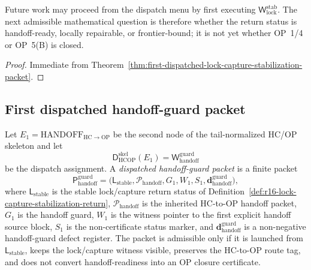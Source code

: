\begin{corollary}
\label{cor:v3340-r16-working-rule}
Future work may proceed from the dispatch menu by first executing \(\mathsf W_{\mathrm{lock}}^{\mathrm{stab}}\). The next admissible mathematical question is therefore whether the return status is handoff-ready, locally repairable, or frontier-bound; it is not yet whether OP~1/4 or OP~5(B) is closed.
\end{corollary}

\begin{proof}
Immediate from Theorem~\ref{thm:first-dispatched-lock-capture-stabilization-packet}.
\end{proof}


\subsection{First dispatched handoff-guard packet}
\label{subsec:first-dispatched-handoff-guard-packet}

\begin{definition}
\label{def:dispatched-handoff-guard-packet}
Let \(E_1=\mathrm{HANDOFF}_{\mathrm{HC}\to\mathrm{OP}}\) be the second node of the tail-normalized HC/OP skeleton and let
\[
 \mathsf D_{\mathrm{HCOP}}^{\mathrm{skel}}(E_1)
 =
 \mathsf W_{\mathrm{handoff}}^{\mathrm{guard}}
\]
be the dispatch assignment. A \emph{dispatched handoff-guard packet} is a finite packet
\[
 \mathsf P_{\mathrm{handoff}}^{\mathrm{guard}}
 =
 \bigl(\mathsf L_{\mathrm{stable}},\mathcal P_{\mathrm{handoff}},G_1,W_1,S_1,
 \mathbf d_{\mathrm{handoff}}^{\mathrm{guard}}\bigr),
\]
where \(\mathsf L_{\mathrm{stable}}\) is the stable lock/capture return status of Definition~\ref{def:r16-lock-capture-stabilization-return}, \(\mathcal P_{\mathrm{handoff}}\) is the inherited HC-to-OP handoff packet, \(G_1\) is the handoff guard, \(W_1\) is the witness pointer to the first explicit handoff source block, \(S_1\) is the non-certificate status marker, and \(\mathbf d_{\mathrm{handoff}}^{\mathrm{guard}}\) is a non-negative handoff-guard defect register. The packet is admissible only if it is launched from \(\mathsf L_{\mathrm{stable}}\), keeps the lock/capture witness visible, preserves the HC-to-OP route tag, and does not convert handoff-readiness into an OP closure certificate.
\end{definition}

